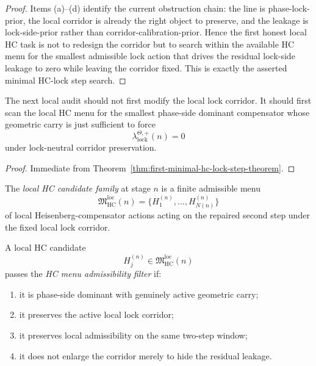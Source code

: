 \begin{proof}
Items (a)--(d) identify the current obstruction chain: the line is phase-lock-prior, the local corridor is already the right object to preserve, and the leakage is lock-side-prior rather than corridor-calibration-prior. Hence the first honest local HC task is not to redesign the corridor but to search within the available HC menu for the smallest admissible lock action that drives the residual lock-side leakage to zero while leaving the corridor fixed. This is exactly the asserted minimal HC-lock step search.
\end{proof}

\begin{corollary}
\label{cor:current-minimal-hc-working-rule}
The next local audit should not first modify the local lock corridor. It should first scan the local HC menu for the smallest phase-side dominant compensator whose geometric carry is just sufficient to force
\[
  \lambda_{\mathrm{lock}}^{\Theta,+}(n)=0
\]
under lock-neutral corridor preservation.
\end{corollary}

\begin{proof}
Immediate from Theorem~\ref{thm:first-minimal-hc-lock-step-theorem}.
\end{proof}



\begin{definition}
\label{def:local-hc-candidate-family}
The \emph{local HC candidate family} at stage $n$ is a finite admissible menu
\[
  \mathfrak M_{\mathrm{HC}}^{\mathrm{loc}}(n)
  =
  \{H_1^{(n)},\dots,H_{N(n)}^{(n)}\}
\]
of local Heisenberg-compensator actions acting on the repaired second step under the fixed local lock corridor.
\end{definition}

\begin{definition}
\label{def:hc-menu-admissibility-filter}
A local HC candidate
\[
  H_j^{(n)}\in \mathfrak M_{\mathrm{HC}}^{\mathrm{loc}}(n)
\]
passes the \emph{HC menu admissibility filter} if:
\begin{enumerate}[leftmargin=2em,label=(\alph*)]
  \item it is phase-side dominant with genuinely active geometric carry;
  \item it preserves the active local lock corridor;
  \item it preserves local admissibility on the same two-step window;
  \item it does not enlarge the corridor merely to hide the residual leakage.
\end{enumerate}
\end{definition}

